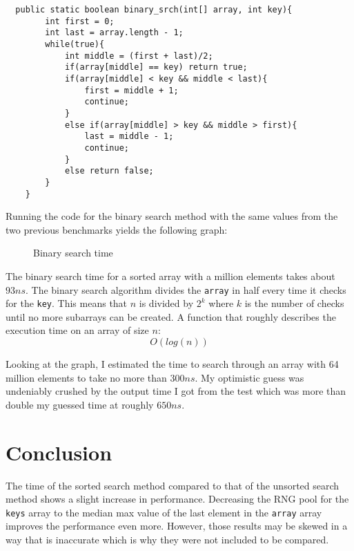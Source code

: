 \documentclass[a4paper,11pt]{article}
\begin{document}
\begin{verbatim}
  public static boolean binary_srch(int[] array, int key){
        int first = 0;
        int last = array.length - 1;
        while(true){
            int middle = (first + last)/2;
            if(array[middle] == key) return true;
            if(array[middle] < key && middle < last){
                first = middle + 1;
                continue;
            }
            else if(array[middle] > key && middle > first){
                last = middle - 1;
                continue;
            }
            else return false;
        }
    }
\end{verbatim}

Running the code for the binary search method with the same values
from the two previous benchmarks yields the following graph: 

\begin{figure}[h]
  \centering
  \caption{Binary search time}
  \label{fig:plot3}
\end{figure}

The binary search time for a sorted array with a million elements takes 
about $ 93 ns$. The binary search algorithm divides the {\tt array} in
half every time it checks for the {\tt key}. This means that $ n$ is 
divided by $ 2^k$ where $ k$ is the number of checks until no more 
subarrays can be created. A function that roughly describes the 
execution time on an array of size $ n$: 
$$ O(log(n))$$

Looking at the graph, I estimated the time to search through an array
with 64 million elements to take no more than $ 300 ns$. My optimistic
guess was undeniably crushed by the output time I got from the test
which was more than double my guessed time at roughly $ 650 ns$.

\section*{Conclusion}

The time of the sorted search method compared to that of the unsorted 
search method shows a slight increase in performance. Decreasing the
RNG pool for the {\tt keys} array to the median max value of the last
element in the {\tt array} array improves the performance even more.
However, those results may be skewed in a way that is inaccurate which
is why they were not included to be compared.
\end{document}
